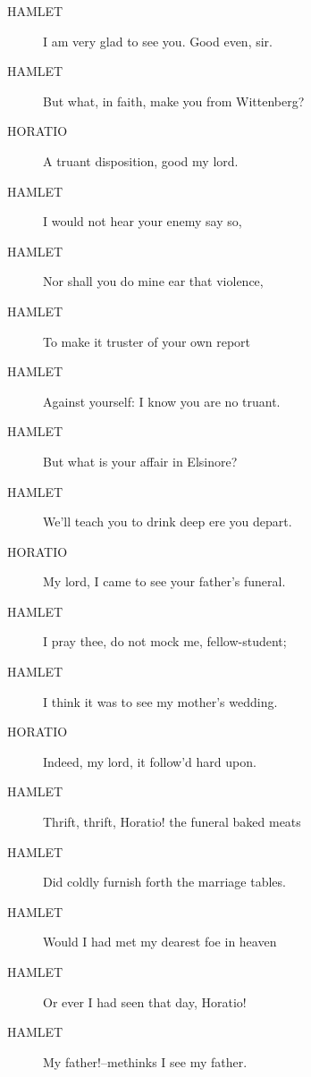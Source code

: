 \documentclass{article}
\begin{document}
\begin{description}
            
\item[HAMLET] I am very glad to see you. Good even, sir.
\item[HAMLET] But what, in faith, make you from Wittenberg?
\end{description}
          
\begin{description}
            
\item[HORATIO] A truant disposition, good my lord.
\end{description}
          
\begin{description}
            
\item[HAMLET] I would not hear your enemy say so,
\item[HAMLET] Nor shall you do mine ear that violence,
\item[HAMLET] To make it truster of your own report
\item[HAMLET] Against yourself: I know you are no truant.
\item[HAMLET] But what is your affair in Elsinore?
\item[HAMLET] We'll teach you to drink deep ere you depart.
\end{description}
          
\begin{description}
            
\item[HORATIO] My lord, I came to see your father's funeral.
\end{description}
          
\begin{description}
            
\item[HAMLET] I pray thee, do not mock me, fellow-student;
\item[HAMLET] I think it was to see my mother's wedding.
\end{description}
          
\begin{description}
            
\item[HORATIO] Indeed, my lord, it follow'd hard upon.
\end{description}
          
\begin{description}
            
\item[HAMLET] Thrift, thrift, Horatio! the funeral baked meats
\item[HAMLET] Did coldly furnish forth the marriage tables.
\item[HAMLET] Would I had met my dearest foe in heaven
\item[HAMLET] Or ever I had seen that day, Horatio!
\item[HAMLET] My father!--methinks I see my father.
\end{description}
          
\end{document}
